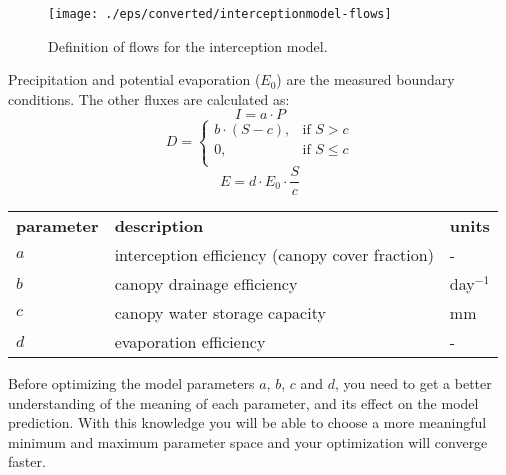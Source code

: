 \begin{figure}[htbp]
  \centering
    \texttt{[image: ./eps/converted/interceptionmodel-flows]}
  \caption{Definition of flows for the interception model.}
  \label{fig:interception-model-flows}
\end{figure}

Precipitation and potential evaporation ($E_0$) are
the measured boundary conditions. The other fluxes are calculated as:
\begin{equation}
I=a\cdot{}P
\end{equation}
\begin{equation}
D =
\begin{cases}
b\cdot{}(S-c), & \text{if }S>c\\
0, & \text{if }S\leq{}c\\
\end{cases}
\end{equation}
\begin{equation}
E = d\cdot{}E_0\cdot{}\frac{S}{c}
\end{equation}
\begin{tabular}{lll}
{\bf parameter}&{\bf description}&{\bf units}\\
$a$&interception efficiency (canopy cover fraction)&\textsf{-}\\
$b$&canopy drainage efficiency&\textsf{day$^{-1}$}\\
$c$&canopy water storage capacity&\textsf{mm}\\
$d$&evaporation efficiency&\textsf{-}\\
\end{tabular}



Before optimizing the model parameters $a$, $b$, $c$ and $d$, you need to get a
better understanding of the meaning of each parameter, and its effect on the
model prediction. With this knowledge you will be able to choose a more
meaningful minimum and maximum parameter space and your optimization will
converge faster.

